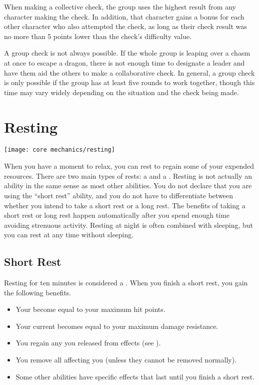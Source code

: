         When making a collective check, the group uses the highest result from any character making the check.
        In addition, that character gains a  bonus for each other character who also attempted the check, as long as their check result was no more than 5 points lower than the check's difficulty value.

         A group check is not always possible. If the whole group is leaping over a chasm at once to escape a dragon, there is not enough time to designate a leader and have them aid the others to make a collaborative check. In general, a group check is only possible if the group has at least five rounds to work together, though this time may vary widely depending on the situation and the check being made.

\section{Resting}\label{Resting}
    \texttt{[image: core mechanics/resting]}

    When you have a moment to relax, you can rest to regain some of your expended resources.
    There are two main types of rests: a  and a .
    Resting is not actually an ability in the same sense as most other abilities.
    You do not declare that you are using the ``short rest'' ability, and you do not have to differentiate between whether you intend to take a short rest or a long rest.
    The benefits of taking a short rest or long rest happen automatically after you spend enough time avoiding strenuous activity.
    Resting at night is often combined with sleeping, but you can rest at any time without sleeping.


    \subsection{Short Rest}\label{Short Rest}
        Resting for ten minutes is considered a .
        When you finish a short rest, you gain the following benefits.
        \begin{itemize}
            \item Your  become equal to your maximum hit points.
            \item Your current  becomes equal to your maximum damage resistance.
            \item You regain any  you released from  effects (see ).
            \item You remove all  affecting you (unless they cannot be removed normally).
            \item Some other abilities have specific effects that last until you finish a short rest.
        \end{itemize}


